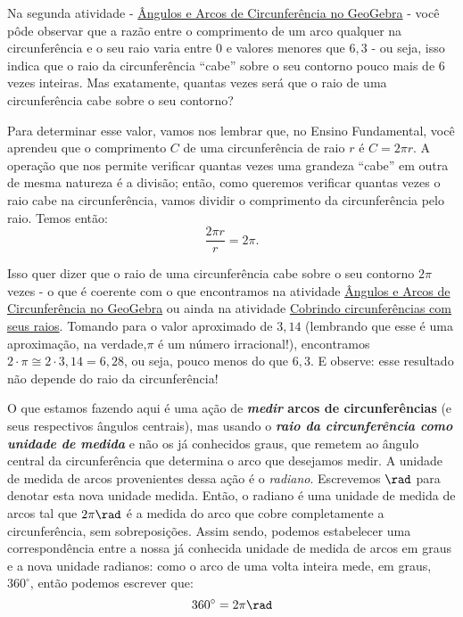 Na segunda atividade - \hyperref[trig-ativ8]{Ângulos e Arcos de Circunferência no GeoGebra} - você pôde observar que a razão entre o comprimento de um arco qualquer na circunferência e o seu raio varia entre $0$ e valores menores que $6{,}3$ - ou seja, isso indica que o raio da circunferência “cabe”{} sobre o seu contorno pouco mais de $6$ vezes inteiras. Mas exatamente, quantas vezes será que o raio de uma circunferência cabe sobre o seu contorno?

Para determinar esse valor, vamos nos lembrar que, no Ensino Fundamental, você aprendeu que o comprimento $C$ de uma circunferência de raio $r$ é $C=2\pi r$. A operação que nos permite verificar quantas vezes uma grandeza “cabe”{} em outra de mesma natureza é a divisão; então, como queremos verificar quantas vezes o raio cabe na circunferência, vamos dividir o comprimento da circunferência pelo raio. Temos então:
\begin{equation*}
\frac{2\pi r}{r}=2\pi.
\end{equation*}

Isso quer dizer que o raio de uma circunferência cabe sobre o seu contorno $2\pi$ vezes - o que é coerente com o que encontramos na atividade \hyperref[trig-ativ8]{Ângulos e Arcos de Circunferência no GeoGebra} ou ainda na atividade \hyperref[trig-ativ7]{Cobrindo circunferências com seus raios}. Tomando para   o valor aproximado de $3{,}14$ (lembrando que esse é uma aproximação, na verdade,$\pi$ é um número irracional!), encontramos $2\cdot\pi\cong2\cdot3{,}14=6{,}28$, ou seja, pouco menos do que $6,3$. E observe: esse resultado não depende do raio da circunferência!

O que estamos fazendo aqui é uma ação de \textbf{\textit{medir} arcos de circunferências} (e seus respectivos ângulos centrais), mas usando o \textbf{\textit{raio da circunferência como unidade de medida}} e não os já conhecidos graus, que remetem ao ângulo central da circunferência que determina o arco que desejamos medir. A unidade de medida de arcos provenientes dessa ação é o \textit{radiano}. Escrevemos $\rad$ para denotar esta nova unidade medida. Então, o radiano é uma unidade de medida de arcos tal que $2\pi \rad$ é a medida do arco que cobre completamente a circunferência, sem sobreposições. Assim sendo, podemos estabelecer uma correspondência entre a nossa já conhecida unidade de medida de arcos em graus e a nova unidade radianos: como o arco de uma volta inteira mede, em graus, $360^{\circ}$, então podemos escrever que:
\begin{equation*}
360^{\circ}=2\pi\rad
\end{equation*}

